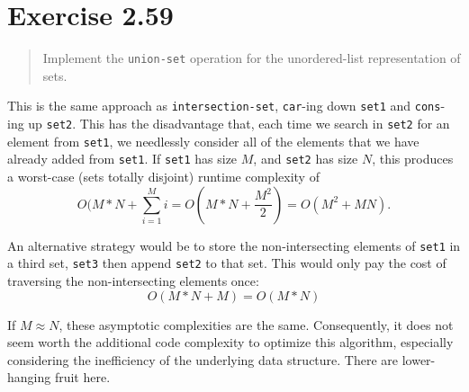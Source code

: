 \documentclass{article}
\begin{document}
\section{Exercise 2.59}
\begin{quote}
    Implement the \texttt{union-set} operation for the unordered-list
    representation of sets.
\end{quote}



This is the same approach as \texttt{intersection-set}, \texttt{car}-ing down
\texttt{set1} and \texttt{cons}-ing up \texttt{set2}. This has the disadvantage
that, each time we search in \texttt{set2} for an element from \texttt{set1},
we needlessly consider all of the elements that we have already added from
\texttt{set1}. If \texttt{set1} has size $M$, and \texttt{set2} has size $N$,
this produces a worst-case (sets totally disjoint) runtime complexity of
\begin{equation*}
    O(M * N + \sum_{i=1}^{M}i = O(M * N + \frac{M^2}{2}) = O(M^2 + MN).
\end{equation*}

An alternative strategy would be to store the non-intersecting elements of
\texttt{set1} in a third set, \texttt{set3} then append \texttt{set2} to that
set. This would only pay the cost of traversing the non-intersecting elements
once:
\begin{equation*}
    O(M * N + M) = O(M *N)
\end{equation*}

If $M \approx N$, these asymptotic complexities are the same. Consequently, it
does not seem worth the additional code complexity to optimize this algorithm,
especially considering the inefficiency of the underlying data structure. There
are lower-hanging fruit here.
\end{document}
